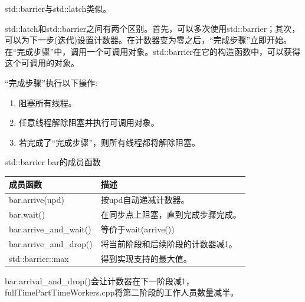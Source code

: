 std::barrier与std::latch类似。


std::latch和std::barrier之间有两个区别。首先，可以多次使用std::barrier；其次，可以为下一步(迭代)设置计数器。在计数器变为零之后，“完成步骤”立即开始。在“完成步骤”中，调用一个可调用对象。std::barrier在它的构造函数中，可以获得这个可调用的对象。

“完成步骤”执行以下操作:

\begin{enumerate}
\item 
阻塞所有线程。

\item 
任意线程解除阻塞并执行可调用对象。

\item 
若完成了“完成步骤”，则所有线程都将解除阻塞。
\end{enumerate}

\begin{center}
std::barrier bar的成员函数
\end{center}

\begin{table}[H]
\centering
\begin{tabular}{ll}
\textbf{成员函数}         & \textbf{描述}                                   \\ \hline
bar.arrive(upd)         & 按upd自动递减计数器。         \\
bar.wait()              & 在同步点上阻塞，直到完成步骤完成。  \\
bar.arrive\_and\_wait() & 等价于wait(arrive())                  \\
bar.arrive\_and\_drop() & 将当前阶段和后续阶段的计数器减1。 \\
std::barrier::max       & 得到实现支持的最大值。
\end{tabular}
\end{table}

bar.arrival\_and\_drop()会让计数器在下一阶段减1，fullTimePartTimeWorkers.cpp将第二阶段的工作人员数量减半。

